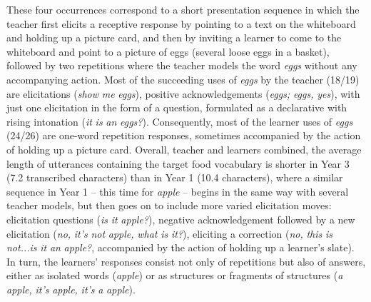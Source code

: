 \documentclass[output=paper,colorlinks,citecolor=brown,modfonts,nonflat]{../langscibook}
\begin{document}
These four occurrences correspond to a short presentation sequence in which the teacher first elicits a receptive response by pointing to a text on the whiteboard and holding up a picture card, and then by inviting a learner to come to the whiteboard and point to a picture of eggs (several loose eggs in a basket), followed by two repetitions where the teacher models the word \textit{eggs} without any accompanying action. Most of the succeeding uses of \textit{eggs} by the teacher (18/19) are elicitations (\textit{show} \textit{me} \textit{eggs}), positive acknowledgements (\textit{eggs;} \textit{eggs,} \textit{yes}), with just one elicitation in the form of a question, formulated as a declarative with rising intonation (\textit{it} \textit{is} \textit{an} \textit{eggs?}). Consequently, most of the learner uses of \textit{eggs} (24/26) are one-word repetition responses, sometimes accompanied by the action of holding up a picture card. Overall, teacher and learners combined, the average length of utterances containing the target food vocabulary is shorter in Year 3 (7.2 transcribed characters) than in Year 1 (10.4 characters), where a similar sequence in Year 1 – this time for \textit{apple} – begins in the same way with several teacher models, but then goes on to include more varied elicitation moves: elicitation questions (\textit{is} \textit{it} \textit{apple?}), negative acknowledgement followed by a new elicitation (\textit{no,} \textit{it’s} \textit{not} \textit{apple,} \textit{what} \textit{is} \textit{it?}), eliciting a correction (\textit{no,} \textit{this} \textit{is} \textit{not...is} \textit{it} \textit{an} \textit{apple?}, accompanied by the action of holding up a learner’s slate). In turn, the learners’ responses consist not only of repetitions but also of answers, either as isolated words (\textit{apple}) or as structures or fragments of structures (\textit{a} \textit{apple,} \textit{it’s} \textit{apple,} \textit{it’s} \textit{a} \textit{apple}).
\end{document}
